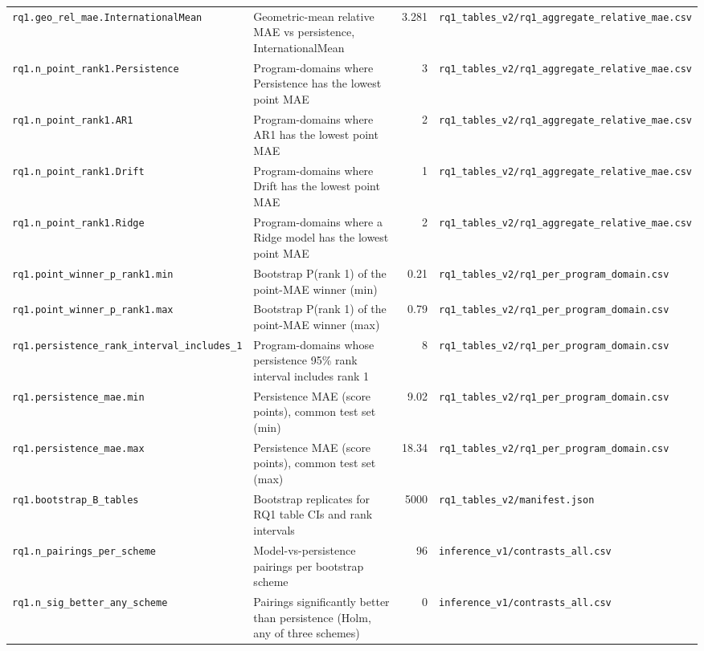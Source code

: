 {\begin{longtable}{p{4.6cm}p{5.6cm}rp{3.6cm}}
\texttt{rq1.geo\_rel\_mae.InternationalMean} & Geometric-mean relative MAE vs persistence, InternationalMean & 3.281 & \texttt{rq1\_tables\_v2/rq1\_aggregate\_relative\_mae.csv} \\
\texttt{rq1.n\_point\_rank1.Persistence} & Program-domains where Persistence has the lowest point MAE & 3 & \texttt{rq1\_tables\_v2/rq1\_aggregate\_relative\_mae.csv} \\
\texttt{rq1.n\_point\_rank1.AR1} & Program-domains where AR1 has the lowest point MAE & 2 & \texttt{rq1\_tables\_v2/rq1\_aggregate\_relative\_mae.csv} \\
\texttt{rq1.n\_point\_rank1.Drift} & Program-domains where Drift has the lowest point MAE & 1 & \texttt{rq1\_tables\_v2/rq1\_aggregate\_relative\_mae.csv} \\
\texttt{rq1.n\_point\_rank1.Ridge} & Program-domains where a Ridge model has the lowest point MAE & 2 & \texttt{rq1\_tables\_v2/rq1\_aggregate\_relative\_mae.csv} \\
\texttt{rq1.point\_winner\_p\_rank1.min} & Bootstrap P(rank 1) of the point-MAE winner (min) & 0.21 & \texttt{rq1\_tables\_v2/rq1\_per\_program\_domain.csv} \\
\texttt{rq1.point\_winner\_p\_rank1.max} & Bootstrap P(rank 1) of the point-MAE winner (max) & 0.79 & \texttt{rq1\_tables\_v2/rq1\_per\_program\_domain.csv} \\
\texttt{rq1.persistence\_rank\_interval\_includes\_1} & Program-domains whose persistence 95\% rank interval includes rank 1 & 8 & \texttt{rq1\_tables\_v2/rq1\_per\_program\_domain.csv} \\
\texttt{rq1.persistence\_mae.min} & Persistence MAE (score points), common test set (min) & 9.02 & \texttt{rq1\_tables\_v2/rq1\_per\_program\_domain.csv} \\
\texttt{rq1.persistence\_mae.max} & Persistence MAE (score points), common test set (max) & 18.34 & \texttt{rq1\_tables\_v2/rq1\_per\_program\_domain.csv} \\
\texttt{rq1.bootstrap\_B\_tables} & Bootstrap replicates for RQ1 table CIs and rank intervals & 5000 & \texttt{rq1\_tables\_v2/manifest.json} \\
\texttt{rq1.n\_pairings\_per\_scheme} & Model-vs-persistence pairings per bootstrap scheme & 96 & \texttt{inference\_v1/contrasts\_all.csv} \\
\texttt{rq1.n\_sig\_better\_any\_scheme} & Pairings significantly better than persistence (Holm, any of three schemes) & 0 & \texttt{inference\_v1/contrasts\_all.csv} \\

\end{longtable}}
